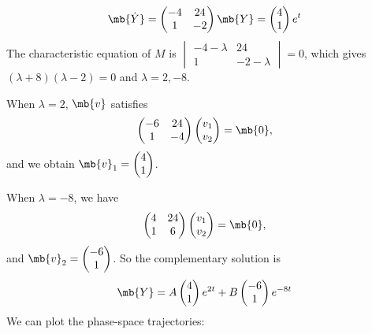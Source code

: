 \documentclass[a4paper]{article}
\begin{document}
\begin{eg}
  \[
  \mb{\dot{Y}} = 
  \begin{pmatrix}
    -4 & 24\\
    1 & -2
  \end{pmatrix}
  \mb{Y} = 
  \begin{pmatrix}
    4\\1
  \end{pmatrix}e^t
  \]
  The characteristic equation of $M$ is $
  \begin{vmatrix}
    -4 - \lambda & 24\\
    1 & -2 - \lambda
  \end{vmatrix} = 0$, which gives $(\lambda + 8)(\lambda - 2) = 0$ and $\lambda = 2, -8$.

  When $\lambda = 2$, $\mb{v}$ satisfies
  \[
  \begin{pmatrix}
    -6 & 24\\
    1 & -4
  \end{pmatrix}
  \begin{pmatrix}
    v_1\\v_2
  \end{pmatrix} = \mb{0},
  \]
  and we obtain $\mb{v}_1 = 
  \begin{pmatrix}
    4\\1
  \end{pmatrix}$.

  When $\lambda = -8$, we have
  \[
  \begin{pmatrix}
    4 & 24\\
    1 & 6
  \end{pmatrix}
  \begin{pmatrix}
    v_1\\v_2
  \end{pmatrix} = \mb{0},
  \]
  and $\mb{v}_2 = 
  \begin{pmatrix}
    -6 \\1
  \end{pmatrix}$. So the complementary solution is 
  \[
  \mb{Y} = A
  \begin{pmatrix}
    4\\1
  \end{pmatrix}e^{2t} + B
  \begin{pmatrix}
    -6\\1
  \end{pmatrix}e^{-8t}
  \]
We can plot the phase-space trajectories:

\begin{center}
\end{center}
\end{eg}
\end{document}

